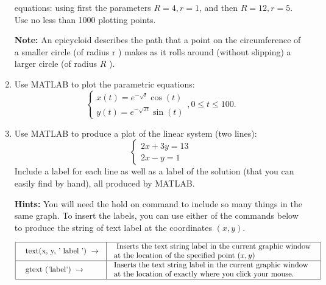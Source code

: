 \documentclass[../main.tex]{subfiles}
\begin{document}
\begin{enumerate}
equations:
using first the parameters $R=4, r=1$, and then $R=12, r=5$. Use no less than 1000 plotting points.

\textbf{Note:} An epicycloid describes the path that a point on the circumference of a smaller circle (of radius $\mathrm{r}$ ) makes as it rolls around (without slipping) a larger circle (of radius $R$ ).
\item Use MATLAB to plot the parametric equations:
$$
\left\{\begin{array}{l}
x(t)=e^{-\sqrt{t}} \cos (t) \\
y(t)=e^{-\sqrt{2 t}} \sin (t)
\end{array}, 0 \leq t \leq 100 .\right.
$$
\item  Use MATLAB to produce a plot of the linear system (two lines):
$$
\left\{\begin{array}{l}
2 x+3 y=13 \\
2 x-y=1
\end{array}\right.
$$
Include a label for each line as well as a label of the solution (that you can easily find by hand), all produced by MATLAB.

\textbf{Hints:} You will need the hold on command to include so many things in the same graph. To insert the labels, you can use either of the commands below to produce the string of text label at the coordinates $(x, y)$.

$
\begin{array}{|l|l|}
\hline \begin{array}{l}
\text {  text(x, y, ' label ') } \rightarrow \\
\end{array} & \begin{array}{l}
\text { Inserts the text string label in the current graphic window } \\
\text {at the location of the specified point $(x, y)$ }
\end{array} \\
\hline \begin{array}{l}
\text { gtext ('label') } \rightarrow \\
\end{array} & \begin{array}{l}
\text {Inserts the text string label in the current graphic window } \\
\text {at the location of exactly where you click your mouse. }
\end{array} \\
\hline
\end{array}
$\\


\end{enumerate}
\end{document}
